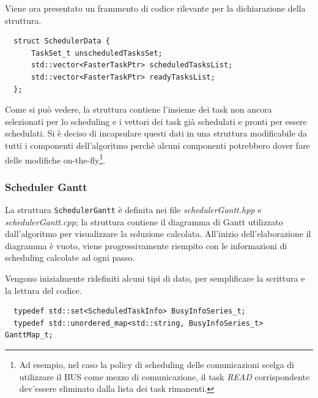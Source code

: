 Viene ora presentato un frammento di codice rilevante per la dichiarazione 
della struttura.
\newline
\begin{verbatim}
  struct SchedulerData {
      TaskSet_t unscheduledTasksSet;
      std::vector<FasterTaskPtr> scheduledTasksList;
      std::vector<FasterTaskPtr> readyTasksList;
  };
\end{verbatim}
Come si può vedere, la struttura contiene l'insieme dei task non ancora 
selezionati per lo scheduling e i vettori dei task già schedulati e pronti per 
essere schedulati. Si è deciso di incapsulare questi dati in una struttura 
modificabile da tutti i componenti dell'algoritmo perchè alcuni componenti 
potrebbero dover fare delle modifiche on-the-fly\footnote{Ad esempio, nel caso 
la policy di scheduling delle comunicazioni scelga di utilizzare il BUS come 
mezzo di comunicazione, il task \emph{READ} corrispondente dev'essere 
eliminato dalla lista dei task rimanenti.}.

\subsubsection{Scheduler Gantt}
La struttura \verb+SchedulerGantt+ è definita nei file 
\emph{schedulerGantt.hpp} e \emph{schedulerGantt.cpp}; la struttura contiene il 
diagramma di Gantt utilizzato dall'algoritmo per visualizzare la soluzione 
calcolata. All'inizio dell'elaborazione il diagramma è vuoto, viene 
progressivamente riempito con le informazioni di scheduling calcolate ad ogni 
passo.

Vengono inizialmente ridefiniti alcuni tipi di dato, per semplificare la 
scrittura e la lettura del codice.
\newline
\begin{verbatim}
  typedef std::set<ScheduledTaskInfo> BusyInfoSeries_t;
  typedef std::unordered_map<std::string, BusyInfoSeries_t> GanttMap_t;
\end{verbatim}

